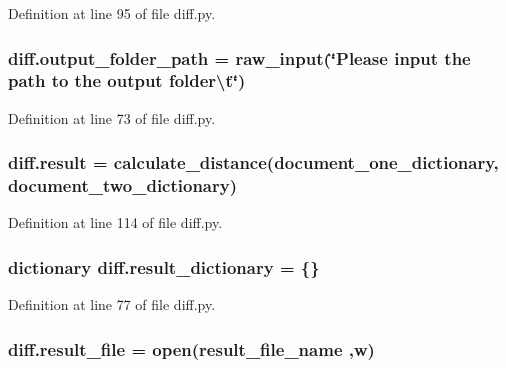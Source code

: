 Definition at line 95 of file diff.\+py.

\subsubsection[{\texorpdfstring{output\+\_\+folder\+\_\+path}{output_folder_path}}]{\setlength{\rightskip}{0pt plus 5cm}diff.\+output\+\_\+folder\+\_\+path = raw\+\_\+input(\char`\"{}Please input the path to the output folder\textbackslash{}t\char`\"{})}\hypertarget{namespacediff_aed454348ccff9ceb835a6c22de15fa95}{}\label{namespacediff_aed454348ccff9ceb835a6c22de15fa95}


Definition at line 73 of file diff.\+py.

\subsubsection[{\texorpdfstring{result}{result}}]{\setlength{\rightskip}{0pt plus 5cm}diff.\+result = {\bf calculate\+\_\+distance}({\bf document\+\_\+one\+\_\+dictionary}, {\bf document\+\_\+two\+\_\+dictionary})}\hypertarget{namespacediff_a5df2e8041c6fff30558b49edee35438a}{}\label{namespacediff_a5df2e8041c6fff30558b49edee35438a}


Definition at line 114 of file diff.\+py.

\subsubsection[{\texorpdfstring{result\+\_\+dictionary}{result_dictionary}}]{\setlength{\rightskip}{0pt plus 5cm}dictionary diff.\+result\+\_\+dictionary = \{\}}\hypertarget{namespacediff_a08d29f91abd1bc75aa7d8ecb3aa39c91}{}\label{namespacediff_a08d29f91abd1bc75aa7d8ecb3aa39c91}


Definition at line 77 of file diff.\+py.

\subsubsection[{\texorpdfstring{result\+\_\+file}{result_file}}]{\setlength{\rightskip}{0pt plus 5cm}diff.\+result\+\_\+file = open({\bf result\+\_\+file\+\_\+name} ,\textquotesingle{}w\textquotesingle{})}\hypertarget{namespacediff_aa1be62f435ce37ca93ba61d4ad88c0c9}{}\label{namespacediff_aa1be62f435ce37ca93ba61d4ad88c0c9}


